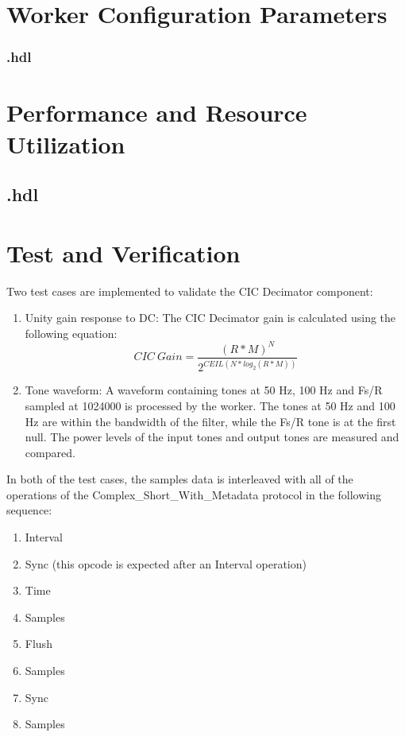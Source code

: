 \begin{landscape}
\section*{Worker Configuration Parameters}
\subsubsection*{\comp.hdl}

\section*{Performance and Resource Utilization}
\subsection*{\comp.hdl}

\end{landscape}
\newpage
\section*{Test and Verification}
Two test cases are implemented to validate the CIC Decimator component:

\begin{enumerate}
	\item Unity gain response to DC: The CIC Decimator gain is calculated using the following equation:
	      \begin{equation} \label{eq:cic_gain}
	      	CIC\ Gain = \frac{(R*M)^N}{2^{CEIL(N*log_2(R*M))}}
	      \end{equation}
	\item Tone waveform: A waveform containing tones at 50 Hz, 100 Hz and Fs/R sampled at 1024000 is processed by the worker. The tones at 50 Hz and 100 Hz are within the bandwidth of the filter, while the Fs/R tone is at the first null. The power levels of the input tones and output tones are measured and compared.
\end{enumerate}\medskip

In both of the test cases, the samples data is interleaved with all of the operations of the Complex\_Short\_With\_Metadata protocol in the following sequence:
\begin{enumerate}
	\item Interval
	\item Sync (this opcode is expected after an Interval operation)
	\item Time
	\item Samples
	\item Flush
	\item Samples
	\item Sync
	\item Samples
\end{enumerate}




